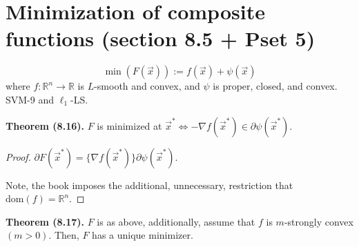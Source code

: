 \documentclass{article}
\newcommand{\R}{\mathbb{R}}             %
\newcommand{\x}{\vec{x}}
\newcommand{\dom}{\text{dom}}           %
\begin{document}
\section{Minimization of composite functions (section 8.5 + Pset 5)}

\[
    \min(F(\x)) := f(\x) + \psi(\x)
\]
where $f \colon \R^n \to \R$ is $L$-smooth and convex, and $\psi$ is proper, closed, and convex. SVM-9 and $\ell_1$-LS.

\textbf{Theorem (8.16).} $F$ is minimized at $\x^* \iff -\nabla f(\x^*) \in \partial \psi(\x^*)$.

\begin{proof}
    $\partial F(\x^*) = \{\nabla f(\x^*)\} \partial \psi(\x^*)$.

    Note, the book imposes the additional, unnecessary, restriction that $\dom(f) = \R^n$.
\end{proof}

\textbf{Theorem (8.17).} $F$ is as above, additionally, assume that $f$ is $m$-strongly convex $(m > 0)$. Then, $F$ has a unique minimizer.
\end{document}
